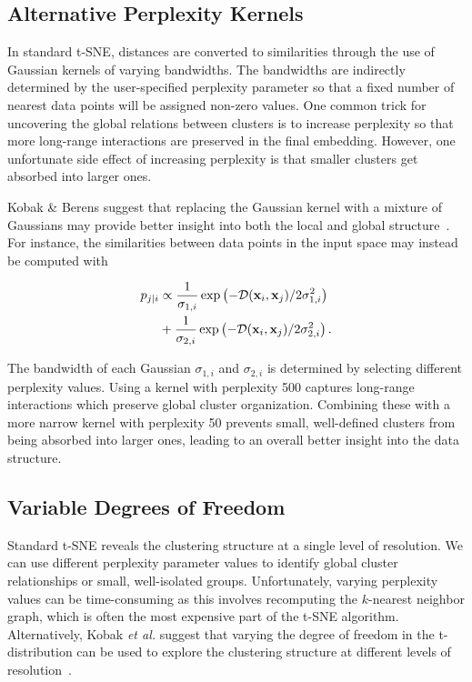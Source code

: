 \documentclass[letter]{article}
\begin{document}
\subsection*{Alternative Perplexity Kernels}

In standard t-SNE, distances are converted to similarities through the use of
Gaussian kernels of varying bandwidths. The bandwidths are indirectly determined
by the user-specified perplexity parameter so that a fixed number of nearest
data points will be assigned non-zero values. One common trick for uncovering
the global relations between clusters is to increase perplexity so that more
long-range interactions are preserved in the final embedding.  However, one
unfortunate side effect of increasing perplexity is that smaller clusters get
absorbed into larger ones.

Kobak \& Berens suggest that replacing the Gaussian kernel with a mixture of
Gaussians may provide better insight into both the local and global
structure~\cite{kobak2019art}. For instance, the similarities between data
points in the input space may instead be computed with

\begin{align}
  p_{j\mid i} &\propto \frac{1}{\sigma_{1,i}} \exp \left ( -\mathcal{D}(\mathbf{x}_i, \mathbf{x}_j ) / 2\sigma_{1,i}^2 \right ) \notag \\
  &+ \frac{1}{\sigma_{2,i}} \exp \left ( -\mathcal{D}(\mathbf{x}_i, \mathbf{x}_j ) / 2\sigma_{2,i}^2 \right ).
\end{align}

The bandwidth of each Gaussian $\sigma_{1,i}$ and $\sigma_{2,i}$ is determined
by selecting different perplexity values. Using a kernel with perplexity 500
captures long-range interactions which preserve global cluster organization.
Combining these with a more narrow kernel with perplexity 50 prevents small,
well-defined clusters from being absorbed into larger ones, leading to an overall better
insight into the data structure.

\subsection*{Variable Degrees of Freedom}

Standard t-SNE reveals the clustering structure at a single level of resolution.
We can use different perplexity parameter values to identify global cluster
relationships or small, well-isolated groups. Unfortunately, varying perplexity
values can be time-consuming as this involves recomputing the $k$-nearest neighbor graph, which is often the most expensive part of the t-SNE algorithm.
Alternatively, Kobak \textit{et al.} suggest that varying the degree of freedom
in the t-distribution can be used to explore the clustering structure at
different levels of resolution~\cite{kobak2019heavy}. 
\end{document}
